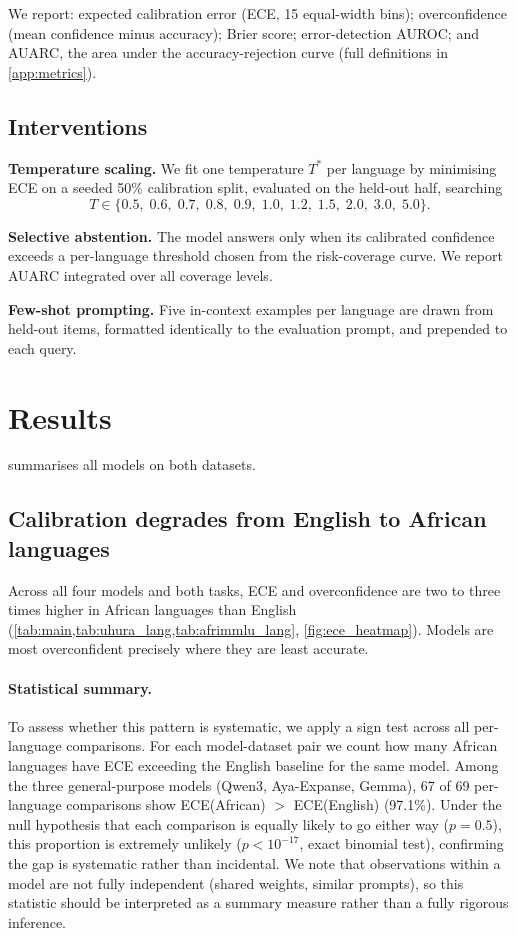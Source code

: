 \documentclass[11pt,a4paper]{article}
\begin{document}
We report: expected calibration error (ECE, 15 equal-width bins); overconfidence
(mean confidence minus accuracy); Brier score; error-detection AUROC; and AUARC,
the area under the accuracy-rejection curve (full definitions in \cref{app:metrics}).

\subsection{Interventions}
\label{sec:interventions}

\textbf{Temperature scaling.}
We fit one temperature $T^*$ per language by minimising ECE on a seeded 50\%
calibration split, evaluated on the held-out half, searching
\[
  T \in \{0.5,\; 0.6,\; 0.7,\; 0.8,\; 0.9,\; 1.0,\; 1.2,\; 1.5,\; 2.0,\; 3.0,\; 5.0\}.
\]

\textbf{Selective abstention.}
The model answers only when its calibrated confidence exceeds a per-language
threshold chosen from the risk-coverage curve. We report AUARC integrated over
all coverage levels.

\textbf{Few-shot prompting.}
Five in-context examples per language are drawn from held-out items, formatted
identically to the evaluation prompt, and prepended to each query.

\section{Results}
\label{sec:results}

 summarises all models on both datasets.

\subsection{Calibration degrades from English to African languages}

Across all four models and both tasks, ECE and overconfidence are two to three
times higher in African languages than English (\cref{tab:main,tab:uhura_lang,tab:afrimmlu_lang},
\cref{fig:ece_heatmap}). Models are most overconfident precisely where they are
least accurate.

\paragraph{Statistical summary.}
To assess whether this pattern is systematic, we apply a sign test across all
per-language comparisons. For each model-dataset pair we count how many African
languages have ECE exceeding the English baseline for the same model. Among the
three general-purpose models (Qwen3, Aya-Expanse, Gemma), 67 of 69 per-language
comparisons show ECE(African) $>$ ECE(English) (97.1\%). Under the null
hypothesis that each comparison is equally likely to go either way ($p = 0.5$),
this proportion is extremely unlikely ($p < 10^{-17}$, exact binomial test),
confirming the gap is systematic rather than incidental. We note that
observations within a model are not fully independent (shared weights, similar
prompts), so this statistic should be interpreted as a summary measure rather
than a fully rigorous inference.
\end{document}

